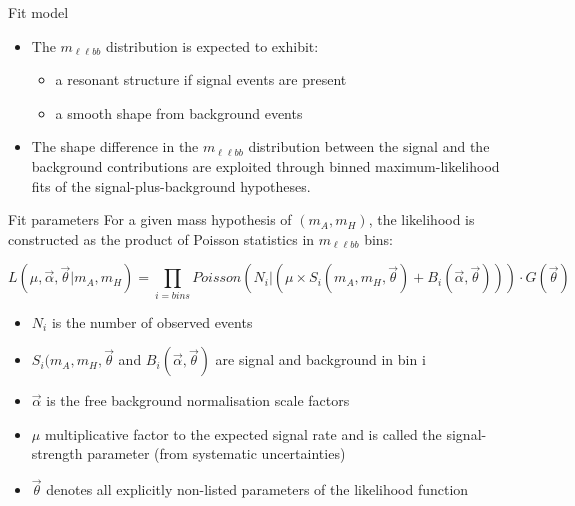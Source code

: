 \documentclass[10pt]{beamer} %
\begin{document}
\begin{frame}{Fit model}
    
    \begin{itemize}
        \item     The $m_{\ell\ell bb}$ distribution is expected to exhibit:
        \begin{itemize}
            \item a resonant structure if signal events are present
            \item a smooth shape from background events
        \end{itemize}

        \item The shape difference in the $m_{\ell\ell bb}$ distribution between the signal and the background contributions are exploited through binned maximum-likelihood fits of the signal-plus-background hypotheses.
    \end{itemize}

\end{frame}

\begin{frame}{Fit parameters}
    For a given mass hypothesis of $(m_A, m_H)$, the likelihood is constructed as the product of Poisson statistics in $m_{\ell\ell bb}$ bins:
    
    \begin{equation}
        L(\mu, \vec{\alpha}, \vec{\theta}| m_A, m_H) = \prod_{i=bins} Poisson \left( N_i | \left( \mu \times S_i (m_A, m_H, \vec{\theta}) + B_i(\vec{\alpha}, \vec{\theta}) \right) \right) \cdot G(\vec{\theta})
    \end{equation}
    
\begin{itemize}
    \item $N_i$ is the number of observed events
    \item $S_i (m_A, m_H, \vec{\theta}$ and $B_i(\vec{\alpha}, \vec{\theta})$ are signal and background in bin i
    \item $\vec{\alpha}$ is the free background normalisation scale factors
    \item $\mu$ multiplicative factor to the expected signal rate and is called the signal-strength parameter (from systematic uncertainties)
    \item $\vec{\theta}$ denotes all explicitly non-listed parameters of the likelihood function
\end{itemize}
    
\end{frame}
\end{document}
